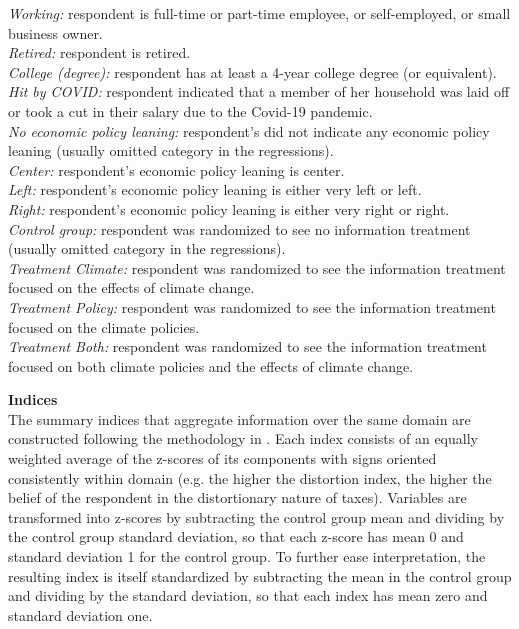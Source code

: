 \documentclass{article}
\begin{document}
\textit{Working:} respondent is full-time or part-time employee, or self-employed, or small business owner. \\
\textit{Retired:} respondent is retired. \\
\textit{College (degree):} respondent has at least a 4-year college degree (or equivalent).\\
\textit{Hit by COVID:} respondent indicated that a member of her household was laid off or took a cut in their salary due to the Covid-19 pandemic.\\
\textit{No economic policy leaning:} respondent's did not indicate any economic policy leaning (usually omitted category in the regressions).\\
\textit{Center:} respondent's economic policy leaning is center.\\
\textit{Left:} respondent's economic policy leaning is either very left or left.\\
\textit{Right:} respondent's economic policy leaning is either very right or right.\\
\textit{Control group:} respondent was randomized to see no information treatment (usually omitted category in the regressions).\\
\textit{Treatment Climate:} respondent was randomized to see the information treatment focused on the effects of climate change.\\
\textit{Treatment Policy:} respondent was randomized to see the information treatment focused on the climate policies.\\
\textit{Treatment Both:} respondent was randomized to see the information treatment focused on both climate policies and the effects of climate change. 

\bigskip 

\noindent \textbf{Indices}\\

The summary indices that aggregate information over the same domain are constructed following the methodology in \citet{Kling_Liebman_Katz}. Each index consists of an equally weighted average of the z-scores of its components with signs oriented consistently within domain (e.g. the higher the distortion index, the higher the belief of the respondent in the distortionary nature of taxes). Variables are transformed into z-scores by subtracting the control group mean and dividing by the control group standard deviation, so that each z-score has mean 0 and standard deviation 1 for the control group. To further ease interpretation, the resulting index is itself standardized by subtracting the mean in the control group and dividing by the standard deviation, so that each index has mean zero and standard deviation one. \\
\end{document}
